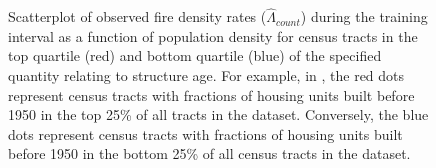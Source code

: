 \documentclass{svjour3}
\begin{document}
\begin{figure}[!htb]
\begin{center}
      \end{center}
      \caption{Scatterplot of observed fire density rates ($\hat\Lambda_{count}$) during the training interval as a function of population density for census tracts in the top quartile (red) and bottom quartile (blue) of the specified quantity relating to structure age. For example, in \protect{}, the red dots represent census tracts with fractions of housing units built before 1950 in the top 25\% of all tracts in the dataset. Conversely, the blue dots represent census tracts with fractions of housing units built before 1950 in the bottom 25\% of all census tracts in the dataset.}
     \label{fig:building age}
  \end{figure}
 
 
   \begin{figure}[!htb]
       \begin{center}
          \\ %
\end{center}
\end{figure}
\end{document}
